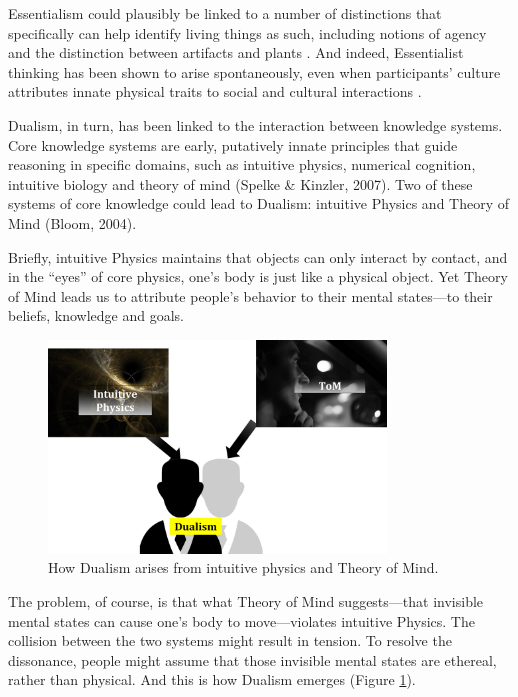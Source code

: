\documentclass[output=paper,colorlinks,citecolor=brown
]{langscibook}
\begin{document}
Essentialism could plausibly be linked to a number of distinctions that specifically can help identify living things as such, including notions of agency \citep{setoh2013young} and the distinction between artifacts and plants \citep{wertz2014selective}. And indeed, Essentialist thinking has been shown to arise spontaneously, even when participants’ culture attributes innate physical traits to social and cultural interactions \citep{astuti2004constraints}.

Dualism, in turn, has been linked to the interaction between knowledge systems. Core knowledge systems are early, putatively innate principles that guide reasoning in specific domains, such as intuitive physics, numerical cognition, intuitive biology and theory of mind (Spelke \& Kinzler, 2007). Two of these systems of core knowledge could lead to Dualism: intuitive Physics and Theory of Mind (Bloom, 2004). 

Briefly, intuitive Physics maintains that objects can only interact by contact, and in the “eyes” of core physics, one’s body is just like a physical object. Yet Theory of Mind leads us to attribute people’s behavior to their mental states—to their beliefs, knowledge and goals. 

\begin{figure}
    \centering
    \includegraphics[width=0.8\textwidth,keepaspectratio]{figures/berent_figure3.jpg}
    \caption{How Dualism arises from intuitive physics and Theory of Mind.}
    \label{fig:figure3}
\end{figure}

The problem, of course, is that what Theory of Mind suggests—that invisible mental states can cause one’s body to move—violates intuitive Physics. The collision between the two systems might result in tension. To resolve the dissonance, people might assume that those invisible mental states are ethereal, rather than physical. And this is how Dualism emerges (Figure \ref{fig:figure3}). 
\end{document}
